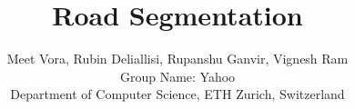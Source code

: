 \documentclass[10pt,conference,compsocconf]{IEEEtran}
\begin{document}
\title{Road Segmentation}

\author{
  Meet Vora, Rubin Deliallisi, Rupanshu Ganvir, Vignesh Ram \\
  Group Name: Yahoo \\
  Department of Computer Science, ETH Zurich, Switzerland
}

\maketitle

\begin{abstract}
\end{abstract}










\end{document}
